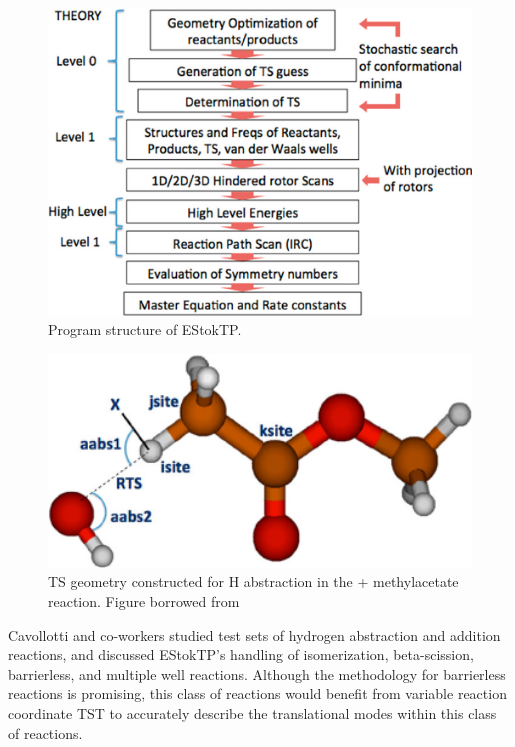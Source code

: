 \documentclass[preprint, 11pt]{elsarticle} %
\begin{document}
\begin{figure}
    \centering
    \includegraphics[width=1\textwidth]{estoktp}
    \caption{Program structure of EStokTP.}
    \label{fig:estoktp_structure}
\end{figure}


\begin{figure}
    \centering
    \includegraphics[width=1\textwidth]{estoktp_habstraction}
    \caption{TS geometry constructed for H abstraction in the  + methylacetate reaction. Figure borrowed from \cite{estoktp:2018}}
    \label{fig:estoktp_habstraction}
\end{figure}

Cavollotti and co-workers studied test sets of hydrogen abstraction and addition reactions, and discussed EStokTP's handling of isomerization, beta-scission, barrierless, and multiple well reactions.
Although the methodology for barrierless reactions is promising, this class of reactions would benefit from variable reaction coordinate TST to accurately describe the translational modes within this class of reactions.
\end{document}
